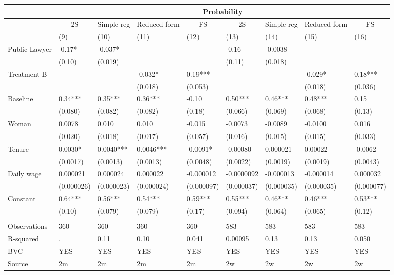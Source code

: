 \begin{tabular}{lllllllll}
\toprule
      & \multicolumn{8}{c}{Probability} \\
\midrule
\midrule
      & \multicolumn{1}{c}{2S} & \multicolumn{1}{c}{Simple reg} & \multicolumn{1}{c}{Reduced form} & \multicolumn{1}{c}{FS} & \multicolumn{1}{c}{2S} & \multicolumn{1}{c}{Simple reg} & \multicolumn{1}{c}{Reduced form} & \multicolumn{1}{c}{FS} \\
\midrule
      & (9)   & (10)  & (11)  & (12)  & (13)  & (14)  & (15)  & (16) \\
\midrule
\midrule
Public Lawyer & -0.17* & -0.037* &       &       & -0.16 & -0.0038 &       &  \\
      & (0.10) & (0.019) &       &       & (0.11) & (0.018) &       &  \\
Treatment B &       &       & -0.032* & 0.19*** &       &       & -0.029* & 0.18*** \\
      &       &       & (0.018) & (0.053) &       &       & (0.018) & (0.036) \\
Baseline & 0.34*** & 0.35*** & 0.36*** & -0.10 & 0.50*** & 0.46*** & 0.48*** & 0.15 \\
      & (0.080) & (0.082) & (0.082) & (0.18) & (0.066) & (0.069) & (0.068) & (0.13) \\
Woman & 0.0078 & 0.010 & 0.010 & -0.015 & -0.0073 & -0.0089 & -0.0100 & 0.016 \\
      & (0.020) & (0.018) & (0.017) & (0.057) & (0.016) & (0.015) & (0.015) & (0.033) \\
Tenure & 0.0030* & 0.0040*** & 0.0046*** & -0.0091* & -0.00080 & 0.000021 & 0.00022 & -0.0062 \\
      & (0.0017) & (0.0013) & (0.0013) & (0.0048) & (0.0022) & (0.0019) & (0.0019) & (0.0043) \\
Daily wage & 0.000021 & 0.000024 & 0.000022 & -0.000012 & -0.0000092 & -0.000013 & -0.000014 & 0.000032 \\
      & (0.000026) & (0.000023) & (0.000024) & (0.000097) & (0.000037) & (0.000035) & (0.000035) & (0.000077) \\
Constant & 0.64*** & 0.56*** & 0.54*** & 0.59*** & 0.55*** & 0.46*** & 0.46*** & 0.53*** \\
      & (0.10) & (0.079) & (0.079) & (0.17) & (0.094) & (0.064) & (0.065) & (0.12) \\
      &       &       &       &       &       &       &       &  \\
\midrule
Observations & 360   & 360   & 360   & 360   & 583   & 583   & 583   & 583 \\
R-squared & .     & 0.11  & 0.10  & 0.041 & 0.00095 & 0.13  & 0.13  & 0.050 \\
BVC   & YES   & YES   & YES   & YES   & YES   & YES   & YES   & YES \\
Source & 2m    & 2m    & 2m    & 2m    & 2w    & 2w    & 2w    & 2w \\
\bottomrule
\bottomrule
\end{tabular}%
